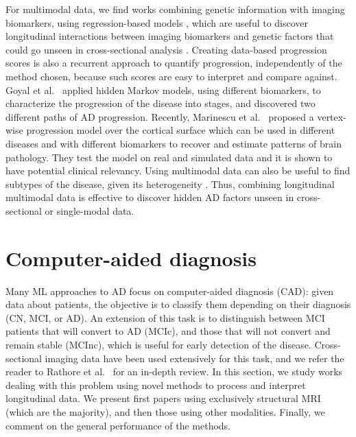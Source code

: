 For multimodal data, we find works combining genetic information with imaging biomarkers, using regression-based models \cite{Silver2012,Vounou2012}, which are useful to discover longitudinal interactions between imaging biomarkers and genetic factors that could go unseen in cross-sectional analysis \cite{Xu2014}. Creating data-based progression scores \cite{Casanova2018,Clark2012,Davatzikos2009,Jedynak2012,Schmidt-Richberg2015} is also a recurrent approach to quantify progression, independently of the method chosen, because such scores are easy to interpret and compare against. Goyal et al.\ \cite{Goyal2018b} applied hidden Markov models, using different biomarkers, to characterize the progression of the disease into stages, and discovered two different paths of AD progression. Recently, Marinescu et al.\ \cite{Marinescu2019} proposed a vertex-wise progression model over the cortical surface which can be used in different diseases and with different biomarkers to recover and estimate patterns of brain pathology. They test the model on real and simulated data and it is shown to have potential clinical relevancy. Using multimodal data can also be useful to find subtypes of the disease, given its heterogeneity \cite{Gamberger2017}. Thus, combining longitudinal multimodal data is effective to discover hidden AD factors unseen in cross-sectional or single-modal data. \\

\section{Computer-aided diagnosis}
\label{sec:classification}

Many ML approaches to AD focus on computer-aided diagnosis (CAD): given data about patients, the objective is to classify them depending on their diagnosis (CN, MCI, or AD). An extension of this task is to distinguish between MCI patients that will convert to AD (MCIc), and those that will not convert and remain stable (MCInc), which is useful for early detection of the disease. Cross-sectional imaging data have been used extensively for this task, and we refer the reader to Rathore et al.\ \cite{Rathore2017} for an in-depth review. In this section, we study works dealing with this problem using novel methods to process and interpret longitudinal data. We present first papers using exclusively structural MRI (which are the majority), and then those using other modalities. Finally, we comment on the general performance of the methods. \\

